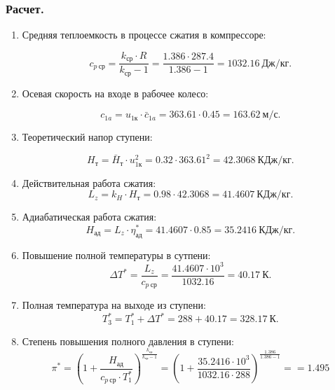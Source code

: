 \documentclass[a4paper,10pt]{article}
\begin{document}
    \subsubsection{Расчет.}

    

    

    \begin{enumerate}

        \item Средняя теплоемкость в процессе сжатия в компрессоре:

        \[
        	c_{p\ ср} = \frac{k_{ср} \cdot R}{k_{ср} - 1} = 
        	\frac{1.386 \cdot 287.4 }{ 1.386 - 1 } =
			1032.16\ Дж/кг.
        \]
		
		\item Осевая скорость на входе в рабочее колесо:
		
		\[
			c_{1a} = u_{1к} \cdot \bar{c}_{1a} = 
			363.61 \cdot 0.45 = 163.62\ м/с.
		\]

        \item Теоретический напор ступени:

        \[
            H_т = \bar{H}_т \cdot u_{1к}^2 = 
            0.32 \cdot 363.61^2 = 
            42.3068\ КДж/кг.
        \]

        \item Действительная работа сжатия:
        \[
            L_z = k_H \cdot H_т = 0.98 \cdot 42.3068 = 
            41.4607\ КДж/кг.
        \]

        \item Адиабатическая работа сжатия:
        \[
            H_{ад} = L_z \cdot \eta_{ад}^* = 
            41.4607 \cdot 0.85 =
            35.2416\ КДж/кг.
        \]

        \item Повышение полной температуры в сутпени:
        \[
            \Delta T^* = \frac{L_z}{c_{p\ ср}} = 
            \frac{ 41.4607 \cdot 10^3 }{ 1032.16 } = 
            40.17\ К.
        \]

        \item Полная температура на выходе из ступени:
        \[
            T_3^* = T_1^* + \Delta T^* = 
            288 + 40.17 = 
            328.17\ К.
        \]

        \item Степень повышения полного давления в ступени:
        \[
            \pi^* = \left( 1 + \frac{ H_{ад} }{ c_{p\ ср} \cdot T_1^* } \right) ^ { \frac{ k_{ср} }{ k_{ср} - 1 } } = 
            \left( 
                1 + \frac{ 35.2416 \cdot 10^3 
                        }{ 1032.16 \cdot 288 } 
            \right) ^ 
            { \frac{ 1.386 }{ 1.386 - 1 } } =
            = 1.495
        \]


\end{enumerate}
\end{document}
